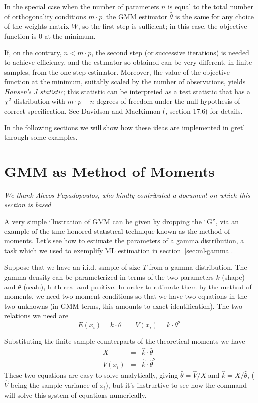 In the special case when the number of parameters $n$ is equal to the
total number of orthogonality conditions $m \cdot p$, the GMM
estimator $\hat{\theta}$ is the same for any choice of the weights
matrix $W$, so the first step is sufficient; in this case, the
objective function is 0 at the minimum. 

If, on the contrary, $n < m \cdot p$, the second step (or successive
iterations) is needed to achieve efficiency, and the estimator so
obtained can be very different, in finite samples, from the one-step
estimator. Moreover, the value of the objective function at the
minimum, suitably scaled by the number of observations, yields
\emph{Hansen's J statistic}; this statistic can be interpreted as a
test statistic that has a $\chi^2$ distribution with $m \cdot p -n $
degrees of freedom under the null hypothesis of correct specification.
See Davidson and MacKinnon (\citeyear{davidson-mackinnon93}, section
17.6) for details.

In the following sections we will show how these ideas are
implemented in gretl through some examples.

\section{GMM as Method of Moments}
\label{sec:gmm-as-mom}

\emph{We thank Alecos Papadopoulos, who kindly contributed a document
  on which this section is based.}

A very simple illustration of GMM can be given by dropping the ``G'',
via an example of the time-honored statistical technique known as the
method of moments. Let's see how to estimate the parameters of a gamma
distribution, a task which we used to exemplify ML estimation in
section~\ref{sec:ml-gamma}.

Suppose that we have an i.i.d. sample of size $T$ from a gamma
distribution. The gamma density can be parameterized in terms of the
two parameters $k$ (shape) and $\theta$ (scale), both real and
positive.  In order to estimate them by the method of moments, we need
two moment conditions so that we have two equations in the two
unknowns (in GMM terms, this amounts to exact identification). The two
relations we need are
\[
  E(x_i) = k \cdot \theta \qquad V(x_i) = k \cdot \theta^2
\]

Substituting the finite-sample counterparts of the theoretical moments
we have
\begin{eqnarray}
  \label{eq:mm-ex-mean}
  \bar{X} & = & \hat{k} \cdot \hat{\theta} \\
  \label{eq:mm-ex-var}
  V(x_i) & = & \hat{k} \cdot \hat{\theta}^2
\end{eqnarray}
These two equations are easy to solve analytically, giving
$\hat{\theta} = \hat{V}/\bar{X}$ and
$\hat{k} = \bar{X}/\hat{\theta}$, ($\hat{V}$ being the sample
variance of $x_i$), but it's instructive to see how the 
command will solve this system of equations numerically.


